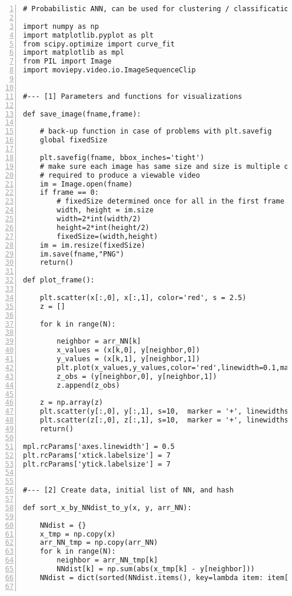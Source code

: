 \documentclass[oneside,10pt]{book}
\begin{document}
\begin{lstlisting}[numbers=left]
# Probabilistic ANN, can be used for clustering / classification

import numpy as np
import matplotlib.pyplot as plt
from scipy.optimize import curve_fit
import matplotlib as mpl
from PIL import Image
import moviepy.video.io.ImageSequenceClip


#--- [1] Parameters and functions for visualizations

def save_image(fname,frame):

    # back-up function in case of problems with plt.savefig
    global fixedSize

    plt.savefig(fname, bbox_inches='tight')    
    # make sure each image has same size and size is multiple of 2
    # required to produce a viewable video   
    im = Image.open(fname)
    if frame == 0:  
        # fixedSize determined once for all in the first frame
        width, height = im.size
        width=2*int(width/2)
        height=2*int(height/2)
        fixedSize=(width,height)
    im = im.resize(fixedSize) 
    im.save(fname,"PNG")
    return()

def plot_frame():

    plt.scatter(x[:,0], x[:,1], color='red', s = 2.5) 
    z = []

    for k in range(N):

        neighbor = arr_NN[k]
        x_values = (x[k,0], y[neighbor,0]) 
        y_values = (x[k,1], y[neighbor,1]) 
        plt.plot(x_values,y_values,color='red',linewidth=0.1,marker=".",markersize=0.1) 
        z_obs = (y[neighbor,0], y[neighbor,1])
        z.append(z_obs)

    z = np.array(z)
    plt.scatter(y[:,0], y[:,1], s=10,  marker = '+', linewidths=0.5, color='green') 
    plt.scatter(z[:,0], z[:,1], s=10,  marker = '+', linewidths=0.5, color='blue')  
    return()

mpl.rcParams['axes.linewidth'] = 0.5
plt.rcParams['xtick.labelsize'] = 7
plt.rcParams['ytick.labelsize'] = 7


#--- [2] Create data, initial list of NN, and hash

def sort_x_by_NNdist_to_y(x, y, arr_NN):

    NNdist = {}
    x_tmp = np.copy(x)
    arr_NN_tmp = np.copy(arr_NN)
    for k in range(N):
        neighbor = arr_NN_tmp[k]
        NNdist[k] = np.sum(abs(x_tmp[k] - y[neighbor]))
    NNdist = dict(sorted(NNdist.items(), key=lambda item: item[1],reverse=True ))


\end{lstlisting}
\end{document}
